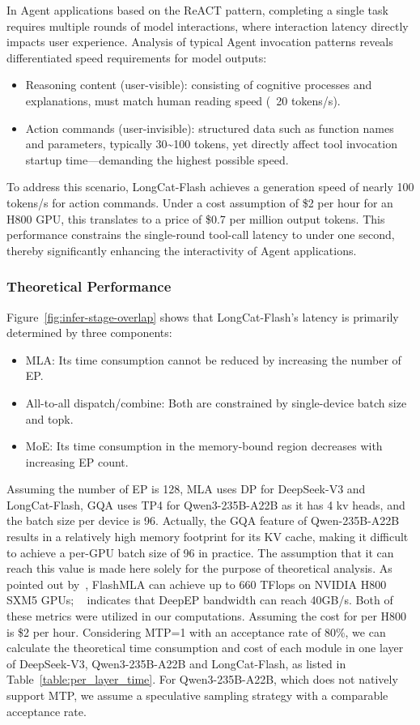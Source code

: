 \documentclass{article}
\newcommand{\longcat}{LongCat-Flash\xspace}
\begin{document}
In Agent applications based on the ReACT \citep{yao2023reactsynergizingreasoningacting} pattern, completing a single task requires multiple rounds of model interactions, where interaction latency directly impacts user experience. Analysis of typical Agent invocation patterns reveals differentiated speed requirements for model outputs:
\begin{itemize}
    \item Reasoning content (user-visible): consisting of cognitive processes and explanations, must match human reading speed (~20 tokens/s).
    \item Action commands (user-invisible): structured data such as function names and parameters, typically 30\textasciitilde 100 tokens, yet directly affect tool invocation startup time—demanding the highest possible speed.
\end{itemize}

To address this scenario, \longcat achieves a generation speed of nearly 100 tokens/s for action commands. Under a cost assumption of \$2 per hour for an H800 GPU, this translates to a price of \$0.7 per million output tokens. This performance constrains the single-round tool-call latency to under one second, thereby significantly enhancing the interactivity of Agent applications.


\subsubsection{Theoretical Performance}

Figure~\ref{fig:infer-stage-overlap} shows that \longcat's latency is primarily determined by three components:
\begin{itemize}
\item MLA: Its time consumption cannot be reduced by increasing the number of EP.
\item All-to-all dispatch/combine: Both are constrained by single-device batch size and topk.
\item MoE: Its time consumption in the memory-bound region decreases with increasing EP count.
\end{itemize}


Assuming the number of EP is 128, MLA uses DP for DeepSeek-V3 and \longcat, GQA uses TP4 for Qwen3-235B-A22B as it has 4 kv heads, and the batch size per device is 96. Actually, the GQA feature of Qwen-235B-A22B results in a relatively high memory footprint for its KV cache, making it difficult to achieve a per-GPU batch size of 96 in practice. The assumption that it can reach this value is made here solely for the purpose of theoretical analysis. As pointed out by~\citep{flashmla2025}, FlashMLA can achieve up to 660 TFlops on NVIDIA H800 SXM5 GPUs; ~\citet{deepep2025} indicates that DeepEP bandwidth can reach 40GB/s. Both of these metrics were utilized in our computations. Assuming the cost for per H800 is \$2 per hour. Considering MTP=1 with an acceptance rate of 80\%, we can calculate the theoretical time consumption and cost of each module in one layer of DeepSeek-V3, Qwen3-235B-A22B and \longcat, as listed in  Table~\ref{table:per_layer_time}. For Qwen3-235B-A22B, which does not natively support MTP, we assume a speculative sampling strategy with a comparable acceptance rate.
\end{document}
